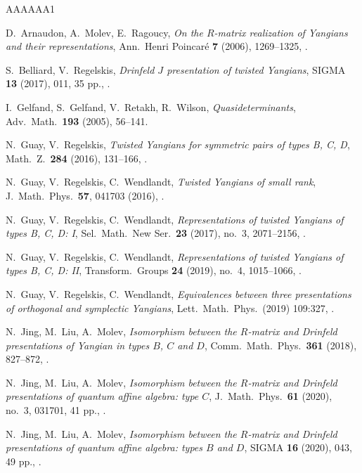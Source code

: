 \documentclass{amsart}
\numberwithin{equation}{section}
\theoremstyle{remark}
\renewcommand{\,}{\kern 0.1em} %
\begin{document}
\begin{thebibliography}{AAAAAA1}


	D.~Arnaudon, A.~Molev, E.~Ragoucy,
	{\it On the $R$-matrix realization of Yangians and their representations},
	Ann.~Henri Poincar\'e {\bf 7} (2006), 1269--1325,
	.

	S.~Belliard, V.~Regelskis,
	{\it Drinfeld $J$ presentation of twisted Yangians},
	SIGMA {\bf 13} (2017), 011, 35 pp.,
	.

	I.~Gelfand, S.~Gelfand, V.~Retakh, R.~Wilson, 
	{\it Quasideterminants}, 
	Adv.~Math.~{\bf 193} (2005), 56--141.

	N.~Guay, V.~Regelskis,
	{\it Twisted Yangians for symmetric pairs of types B, C, D},
	Math.~Z.~{\bf 284} (2016), 131--166,
	.
	
	N.~Guay, V.~Regelskis, C.~Wendlandt,
	{\it Twisted Yangians of small rank},
	J.~Math.~Phys.~{\bf 57}, 041703 (2016),
	.
	
	N.~Guay, V.~Regelskis, C.~Wendlandt,
	{\it Representations of twisted Yangians of types B, C, D: I},
	Sel.~Math.~New Ser.~{\bf 23} (2017), no.~3, 2071--2156,
	.
	
	N.~Guay, V.~Regelskis, C.~Wendlandt,
	{\it Representations of twisted Yangians of types B, C, D: II},
	Transform.~Groups {\bf 24} (2019), no.~4, 1015--1066,
	.

	N.~Guay, V.~Regelskis, C.~Wendlandt,
	{\it Equivalences between three presentations of orthogonal and symplectic Yangians},
	Lett.~Math.~Phys.~(2019) 109:327,
	.

	N.~Jing, M.~Liu, A.~Molev,
	{\it Isomorphism between the $R$-matrix and Drinfeld presentations of Yangian in types $B$, $C$ and $D$},
	Comm.~Math.~Phys.~{\bf 361} (2018), 827--872,
	.
	
	N.~Jing, M.~Liu, A.~Molev,
	{\it Isomorphism between the $R$-matrix and Drinfeld presentations of quantum affine algebra: type $C$},
	J.~Math.~Phys.~{\bf 61} (2020), no.~3, 031701, 41 pp.,
	.

	N.~Jing, M.~Liu, A.~Molev,
	{\it Isomorphism between the $R$-matrix and Drinfeld presentations of quantum affine algebra: types $B$ and $D$},
	SIGMA {\bf 16} (2020), 043, 49 pp.,
	.


\end{thebibliography}
\end{document}
